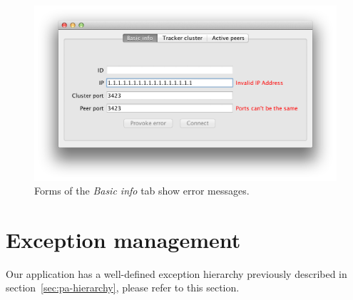 \documentclass[twoside,a4paper,10pt]{article}
\begin{document}
\begin{figure}[!htp]
  \centering
  \includegraphics[width=\textwidth]{imgs/form_validation.png}
  \caption{\label{fig:validation}Forms of the \emph{Basic info} tab show
    error messages.}
\end{figure}

\FloatBarrier

\section{Exception management}

Our application has a well-defined exception hierarchy previously described
in section~\ref{sec:pa-hierarchy}, please refer to this section.

%
%
\end{document}
